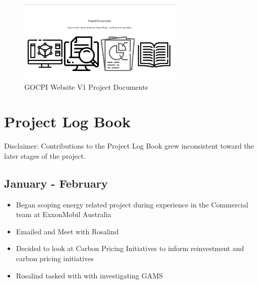 \documentclass[12pt]{article}
\begin{document}
\begin{figure}[H]
    \centering
	\includegraphics[width=0.7\textwidth]{W5.png}
    \caption{GOCPI Website V1 Project Documents}
    \label{fig:WV1PD}
\end{figure}
\newpage

\section{Project Log Book}
Disclaimer: Contributions to the Project Log Book grew inconsistent toward the later stages of the project.
\subsection*{January - February}
\begin{itemize}
	\item Began scoping energy related project during experience in the Commercial team at ExxonMobil Australia
	\item Emailed and Meet with Rosalind
	\item Decided to look at Carbon Pricing Initiatives to inform reinvestment and carbon pricing initiatives
	\item Rosalind tasked with with investigating GAMS
\end{itemize}
\end{document}
